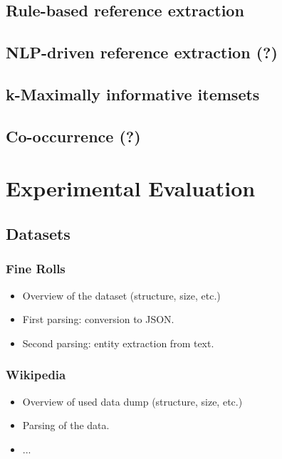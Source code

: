 \documentclass[paper=a4, fontsize=11pt]{scrartcl}
\begin{document}
\subsection{Rule-based reference extraction}

\subsection{NLP-driven reference extraction (?)}

\subsection{k-Maximally informative itemsets}

\subsection{Co-occurrence (?)}




\section{Experimental Evaluation}

\subsection{Datasets}

\subsubsection{Fine Rolls}

\begin{itemize}
	\item Overview of the dataset (structure, size, etc.)
	\item First parsing: conversion to JSON.
	\item Second parsing: entity extraction from text.
\end{itemize}


\subsubsection{Wikipedia}
	
\begin{itemize}
	\item Overview of used data dump (structure, size, etc.)
	\item Parsing of the data.
	\item ...
\end{itemize}
\end{document}
